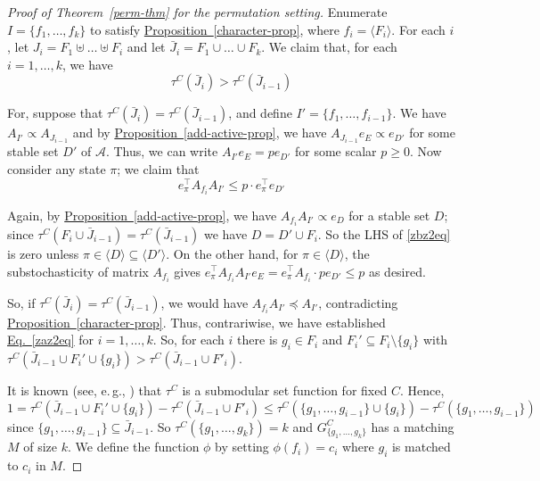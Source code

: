 \documentclass[11pt]{article}
\newcommand{\expref}[2]{\texorpdfstring{\hyperref[#2]{#1~\ref{#2}}}{#1~\ref{#2}}}
\newcommand{\expeqref}[2]{\texorpdfstring{\hyperref[#2]{#1~\eqref{#2}}}{#1~\eqref{#2}}}
\newcommand{\eg}{e.\,g.}
\begin{document}
\begin{proof}[Proof of Theorem~\ref{perm-thm} for the permutation setting]
Enumerate $I = \{ f_1, \dots, f_k \}$ to satisfy \expref{Proposition}{character-prop}, where $f_i = \langle F_i \rangle$. For each $i$, let $J_i = F_1 \uplus \dots \uplus F_i$ and let $\bar J_i = F_1 \cup \dots \cup F_k$. We claim that, for each $i = 1, \dots, k$, we have
\begin{equation}
\label{zaz2eq}
\tau^C( \bar J_i) > \tau^C( \bar J_{i-1})
\end{equation}


For, suppose that $\tau^C(\bar J_i) = \tau^C(\bar J_{i-1})$, and define $I' = \{f_1, \dots, f_{i-1} \}$. We have $A_{I'} \propto A_{J_{i-1}}$ and by \expref{Proposition}{add-active-prop}, we have $A_{J_{i-1}} e_E \propto e_{D'}$ for some stable set $D'$ of $\mathcal A$. Thus, we can write $A_{I'} e_E = p e_{D'}$ for some scalar  $p \geq 0$.  Now consider any state $\pi$; we claim that 
\begin{equation}
\label{zbz2eq}
e_{\pi}^{\top} A_{f_i} A_{I'} \leq p \cdot e_{\pi}^{\top} e_{D'}
\end{equation}

Again, by \expref{Proposition}{add-active-prop}, we have $A_{f_i} A_{I'} \propto e_D$ for a stable set $D$; since $\tau^C(F_i \cup \bar J_{i-1}) = \tau^C(\bar J_{i-1})$ we have $D = D' \cup F_i$.   So the LHS of \eqref{zbz2eq} is zero unless $\pi \in \langle D \rangle \subseteq \langle D' \rangle$. On the other hand, for $\pi \in \langle D \rangle$, the substochasticity of matrix $A_{f_i}$ gives $  e_{\pi}^{\top} A_{f_i} A_{I'} e_E = e_{\pi}^{\top} A_{f_i} \cdot p e_{D'}  \leq p$  as desired.
  
  So, if $\tau^C(\bar J_i) = \tau^C(\bar J_{i-1})$, we would have $  A_{f_i} A_{I'} \preceq A_{I'}$, contradicting \expref{Proposition}{character-prop}.  Thus, contrariwise, we have established  
\expeqref{Eq.}{zaz2eq} for $i =1, \dots, k$. So,  for each $i$ there is $g_i \in F_i$ and $F_i' \subseteq F_i \setminus \{g_i \}$ with $\tau^C(\bar J_{i-1} \cup F_i' \cup \{g_i \}) > \tau^C(\bar J_{i-1} \cup F'_i)$. 

It is known (see, \eg, \cite[Example 1.4]{lovasz1983}) that $\tau^C$ is a submodular set function for fixed $C$. Hence, 
$$
1 = \tau^C(\bar J_{i-1} \cup F_i' \cup \{g_i \}) - \tau^C(\bar J_{i-1} \cup F'_i) \leq \tau^C(\{g_1, \dots, g_{i-1} \} \cup \{g_i \}) - \tau^C( \{g_1, \dots, g_{i-1} \})
$$
since $\{g_1, \dots, g_{i-1} \} \subseteq \bar J_{i-1}$.  So $\tau^C( \{g_1, \dots, g_k \}) = k$ and $G^C_{ \{ g_1, \dots, g_k \} }$ has a matching $M$ of size $k$.  We define the function $\phi$ by setting $\phi( f_i ) = c_i$ where $g_i$ is matched to $c_i$ in $M$.
\end{proof}
\end{document}
